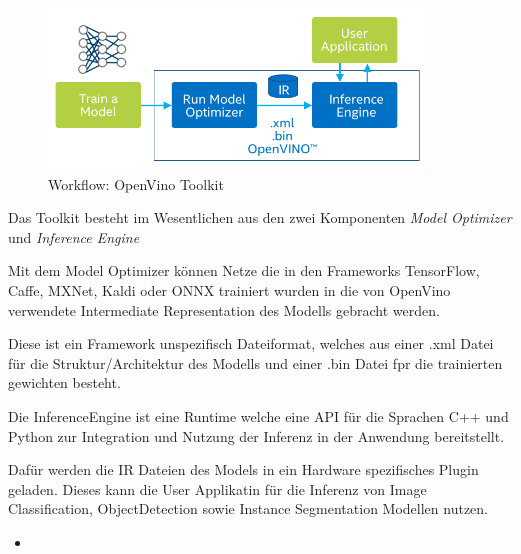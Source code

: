 \begin{figure}[htb]
    \centering
    \includegraphics[width=10cm]{./Bilder/open_vino_workflow_steps.png}
    \caption{Workflow: OpenVino Toolkit}
    \label{img:openvinoworkflow}
\end{figure}

Das Toolkit besteht im Wesentlichen aus den zwei Komponenten 
\textit{Model Optimizer} und \textit{Inference Engine}

Mit dem Model Optimizer können Netze die in den Frameworks 
TensorFlow, Caffe, MXNet, Kaldi oder ONNX trainiert wurden 
in die von OpenVino verwendete Intermediate Representation 
des Modells gebracht werden.

Diese ist ein Framework unspezifisch Dateiformat, welches aus 
einer .xml Datei für die Struktur/Architektur des Modells
und einer .bin Datei fpr die trainierten gewichten besteht.


Die InferenceEngine ist eine Runtime welche eine API für die 
Sprachen C++ und Python zur Integration und Nutzung der Inferenz 
in der Anwendung bereitstellt.

Dafür werden die IR Dateien des Models in ein Hardware spezifisches 
Plugin geladen. Dieses kann die User Applikatin für die Inferenz 
von Image Classification, ObjectDetection sowie Instance Segmentation
Modellen nutzen.




\begin{itemize}
    \item 
\end{itemize}